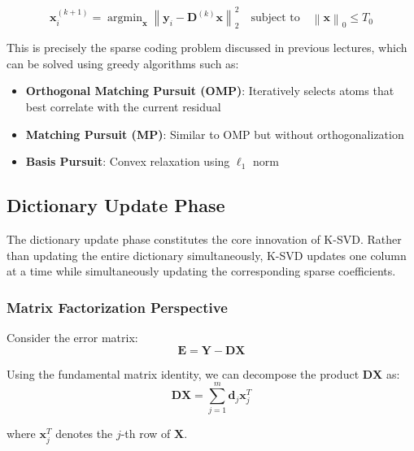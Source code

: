 \documentclass[12pt]{article}
\renewcommand{\vec}[1]{\mathbf{#1}}
\DeclareMathOperator{\argmin}{argmin}
\newcommand{\norm}[1]{\left\|#1\right\|}
\theoremstyle{definition}
\begin{document}
\begin{equation}\label{eq:sparse_coding}
    \vec{x}_i^{(k+1)} = \argmin_{\vec{x}} \norm{\vec{y}_i - \mathbf{D}^{(k)}\vec{x}}_2^2 \quad \text{subject to} \quad \norm{\vec{x}}_0 \leq T_0
\end{equation}

This is precisely the sparse coding problem discussed in previous lectures, which can be solved using greedy algorithms such as:

\begin{itemize}
    \item \textbf{Orthogonal Matching Pursuit (OMP)}: Iteratively selects atoms that best correlate with the current residual
    \item \textbf{Matching Pursuit (MP)}: Similar to OMP but without orthogonalization
    \item \textbf{Basis Pursuit}: Convex relaxation using $\ell_1$ norm
\end{itemize}


\subsection{Dictionary Update Phase}\label{sec:dict_update}

The dictionary update phase constitutes the core innovation of K-SVD. Rather than updating the entire dictionary simultaneously, K-SVD updates one column at a time while simultaneously updating the corresponding sparse coefficients.

\subsubsection{Matrix Factorization Perspective}

Consider the error matrix:
\begin{equation}\label{eq:error_matrix}
    \mathbf{E} = \mathbf{Y} - \mathbf{D}\mathbf{X}
\end{equation}

Using the fundamental matrix identity, we can decompose the product $\mathbf{D}\mathbf{X}$ as:
\begin{equation}\label{eq:matrix_decomp}
    \mathbf{D}\mathbf{X} = \sum_{j=1}^{m} \vec{d}_j \vec{x}_j^T
\end{equation}

where $\vec{x}_j^T$ denotes the $j$-th row of $\mathbf{X}$.
\end{document}
